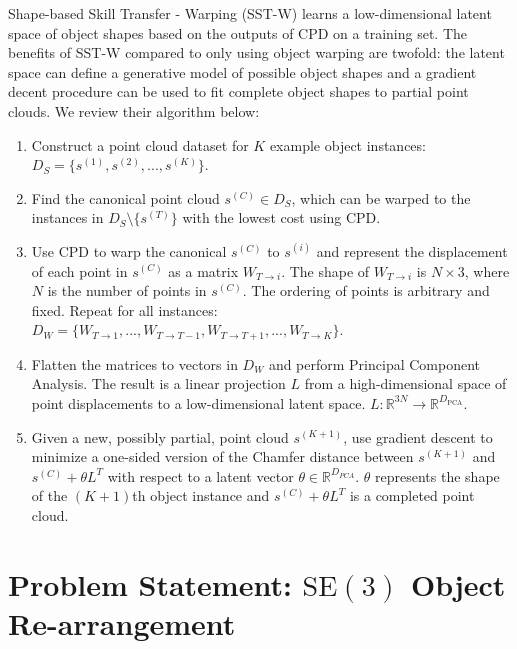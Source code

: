 \documentclass{article}
\begin{document}
Shape-based Skill Transfer - Warping (SST-W) \cite{thompson21ShapeBased} learns a low-dimensional latent space of object shapes based on the outputs of CPD on a training set. The benefits of SST-W compared to only using object warping are twofold: the latent space can define a generative model of possible object shapes and a gradient decent procedure can be used to fit complete object shapes to partial point clouds. We review their algorithm below:

\begin{enumerate}
    \item Construct a point cloud dataset for $K$ example object instances: $D_S = \{ s^{(1)}, s^{(2)}, ..., s^{(K)} \}$.
    \item Find the canonical point cloud $s^{(C)} \in D_S$, which can be warped to the instances in $D_S \setminus \{s^{(T)}\}$ with the lowest cost using CPD.
    \item Use CPD to warp the canonical $s^{(C)}$ to $s^{(i)}$ and represent the displacement of each point in $s^{(C)}$ as a matrix $W_{T \rightarrow i}$. The shape of $W_{T \rightarrow i}$ is $N{\times}3$, where $N$ is the number of points in $s^{(C)}$. The ordering of points is arbitrary and fixed. Repeat for all instances: $D_W = \{ W_{T \rightarrow 1}, ..., W_{T \rightarrow T - 1}, W_{T \rightarrow T + 1}, ..., W_{T \rightarrow K} \}$.
    \item Flatten the matrices to vectors in $D_W$ and perform Principal Component Analysis. The result is a linear projection $L$ from a high-dimensional space of point displacements to a low-dimensional latent space. $L: \mathbb{R}^{3N} \rightarrow \mathbb{R}^{D_{\mathrm{PCA}}}$.
    \item Given a new, possibly partial, point cloud $s^{(K+1)}$, use gradient descent to minimize a one-sided version of the Chamfer distance \cite{fan17point} between $s^{(K+1)}$ and $s^{(C)} + \theta L^T$ with respect to a latent vector $\theta \in \mathbb{R}^{D_{PCA}}$. $\theta$ represents the shape of the $(K+1)$th object instance and $s^{(C)} + \theta L^T$ is a completed point cloud.
\end{enumerate}

\section{Problem Statement: $\mathrm{SE(3)}$ Object Re-arrangement}
\end{document}
